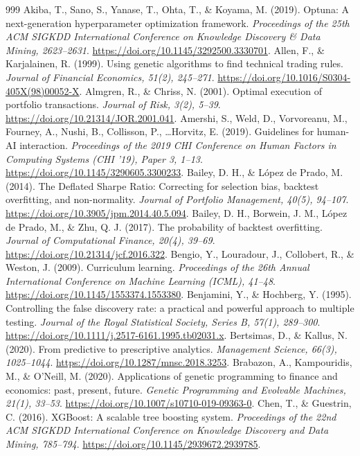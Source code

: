 \documentclass[analytics,article,submit,pdftex,moreauthors]{Definitions/mdpi}
\begin{document}
\begin{thebibliography}{999}
 Akiba, T., Sano, S., Yanase, T., Ohta, T., \& Koyama, M. (2019). Optuna: A next-generation hyperparameter optimization framework. \emph{Proceedings of the 25th ACM SIGKDD International Conference on Knowledge Discovery \& Data Mining, 2623--2631}. \url{https://doi.org/10.1145/3292500.3330701}.
 Allen, F., \& Karjalainen, R. (1999). Using genetic algorithms to find technical trading rules. \emph{Journal of Financial Economics, 51(2), 245--271}. \url{https://doi.org/10.1016/S0304-405X(98)00052-X}.
 Almgren, R., \& Chriss, N. (2001). Optimal execution of portfolio transactions. \emph{Journal of Risk, 3(2), 5--39}. \url{https://doi.org/10.21314/JOR.2001.041}.
 Amershi, S., Weld, D., Vorvoreanu, M., Fourney, A., Nushi, B., Collisson, P., \ldots Horvitz, E. (2019). Guidelines for human-AI interaction. \emph{Proceedings of the 2019 CHI Conference on Human Factors in Computing Systems (CHI '19), Paper 3, 1--13}. \url{https://doi.org/10.1145/3290605.3300233}.
 Bailey, D. H., \& López de Prado, M. (2014). The Deflated Sharpe Ratio: Correcting for selection bias, backtest overfitting, and non-normality. \emph{Journal of Portfolio Management, 40(5), 94--107}. \url{https://doi.org/10.3905/jpm.2014.40.5.094}.
 Bailey, D. H., Borwein, J. M., López de Prado, M., \& Zhu, Q. J. (2017). The probability of backtest overfitting. \emph{Journal of Computational Finance, 20(4), 39--69}. \url{https://doi.org/10.21314/jcf.2016.322}.
 Bengio, Y., Louradour, J., Collobert, R., \& Weston, J. (2009). Curriculum learning. \emph{Proceedings of the 26th Annual International Conference on Machine Learning (ICML), 41--48}. \url{https://doi.org/10.1145/1553374.1553380}.
 Benjamini, Y., \& Hochberg, Y. (1995). Controlling the false discovery rate: a practical and powerful approach to multiple testing. \emph{Journal of the Royal Statistical Society, Series B, 57(1), 289--300}. \url{https://doi.org/10.1111/j.2517-6161.1995.tb02031.x}.
 Bertsimas, D., \& Kallus, N. (2020). From predictive to prescriptive analytics. \emph{Management Science, 66(3), 1025--1044}. \url{https://doi.org/10.1287/mnsc.2018.3253}.
 Brabazon, A., Kampouridis, M., \& O'Neill, M. (2020). Applications of genetic programming to finance and economics: past, present, future. \emph{Genetic Programming and Evolvable Machines, 21(1), 33--53}. \url{https://doi.org/10.1007/s10710-019-09363-0}.
 Chen, T., \& Guestrin, C. (2016). XGBoost: A scalable tree boosting system. \emph{Proceedings of the 22nd ACM SIGKDD International Conference on Knowledge Discovery and Data Mining, 785--794}. \url{https://doi.org/10.1145/2939672.2939785}.


\end{thebibliography}
\end{document}
